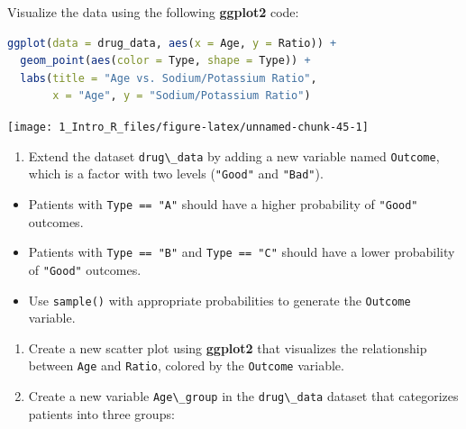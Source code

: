 \documentclass[
  11pt,
]{book}
\newcommand{\passthrough}[1]{#1}
\providecommand{\tightlist}{%
  \setlength{\itemsep}{0pt}\setlength{\parskip}{0pt}}
\theoremstyle{definition}
\theoremstyle{definition}
\theoremstyle{definition}
\theoremstyle{definition}
\theoremstyle{remark}
\begin{document}
Visualize the data using the following \textbf{ggplot2} code:

\begin{lstlisting}[language=R]
ggplot(data = drug_data, aes(x = Age, y = Ratio)) +
  geom_point(aes(color = Type, shape = Type)) + 
  labs(title = "Age vs. Sodium/Potassium Ratio", 
       x = "Age", y = "Sodium/Potassium Ratio")
\end{lstlisting}

\begin{center}\texttt{[image: 1\_Intro\_R\_files/figure-latex/unnamed-chunk-45-1]} \end{center}

\begin{enumerate}
\def\labelenumi{\arabic{enumi}.}
\setcounter{enumi}{17}
\tightlist
\item
  Extend the dataset \passthrough{\lstinline!drug\_data!} by adding a new variable named \passthrough{\lstinline!Outcome!}, which is a factor with two levels (\passthrough{\lstinline!"Good"!} and \passthrough{\lstinline!"Bad"!}).\\
\end{enumerate}

\begin{itemize}
\tightlist
\item
  Patients with \passthrough{\lstinline!Type == "A"!} should have a higher probability of \passthrough{\lstinline!"Good"!} outcomes.\\
\item
  Patients with \passthrough{\lstinline!Type == "B"!} and \passthrough{\lstinline!Type == "C"!} should have a lower probability of \passthrough{\lstinline!"Good"!} outcomes.\\
\item
  Use \passthrough{\lstinline!sample()!} with appropriate probabilities to generate the \passthrough{\lstinline!Outcome!} variable.\\
\end{itemize}

\begin{enumerate}
\def\labelenumi{\arabic{enumi}.}
\setcounter{enumi}{18}
\tightlist
\item
  Create a new scatter plot using \textbf{ggplot2} that visualizes the relationship between \passthrough{\lstinline!Age!} and \passthrough{\lstinline!Ratio!}, colored by the \passthrough{\lstinline!Outcome!} variable.
\item
  Create a new variable \passthrough{\lstinline!Age\_group!} in the \passthrough{\lstinline!drug\_data!} dataset that categorizes patients into three groups:\\
\end{enumerate}
\end{document}
